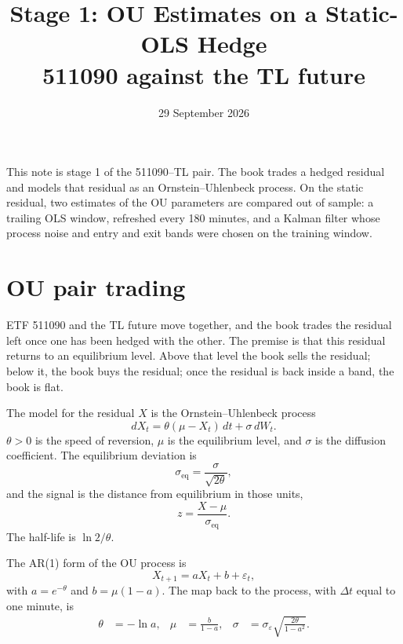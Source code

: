 \documentclass[11pt]{article}
\title{Stage 1: OU Estimates on a Static-OLS Hedge\\[0.3em]
\large 511090 against the TL future}
\date{29 September 2026}
\begin{document}
\maketitle

This note is stage 1 of the 511090--TL pair. The book trades a hedged residual and models that residual as an Ornstein--Uhlenbeck process. On the static residual, two estimates of the OU parameters are compared out of sample: a trailing OLS window, refreshed every 180 minutes, and a Kalman filter whose process noise and entry and exit bands were chosen on the training window.

\section{OU pair trading}
\label{sec:ou}

ETF 511090 and the TL future move together, and the book trades the residual left once one has been hedged with the other. The premise is that this residual returns to an equilibrium level. Above that level the book sells the residual; below it, the book buys the residual; once the residual is back inside a band, the book is flat.

The model for the residual $X$ is the Ornstein--Uhlenbeck process
\begin{equation}
dX_t = \theta(\mu - X_t)\,dt + \sigma\,dW_t.
\end{equation}
$\theta > 0$ is the speed of reversion, $\mu$ is the equilibrium level, and $\sigma$ is the diffusion coefficient. The equilibrium deviation is
\begin{equation}
\sigma_{\mathrm{eq}} = \frac{\sigma}{\sqrt{2\theta}},
\end{equation}
and the signal is the distance from equilibrium in those units,
\begin{equation}
z = \frac{X - \mu}{\sigma_{\mathrm{eq}}}.
\end{equation}
The half-life is $\ln 2 / \theta$.

The AR(1) form of the OU process is
\begin{equation}
X_{t+1} = a X_t + b + \varepsilon_t,
\end{equation}
with $a = e^{-\theta}$ and $b = \mu(1-a)$. The map back to the process, with $\Delta t$ equal to one minute, is
\begin{align}
\theta &= -\ln a, &
\mu &= \frac{b}{1-a}, &
\sigma &= \sigma_\varepsilon \sqrt{\frac{2\theta}{1-a^2}}.
\end{align}
\end{document}
